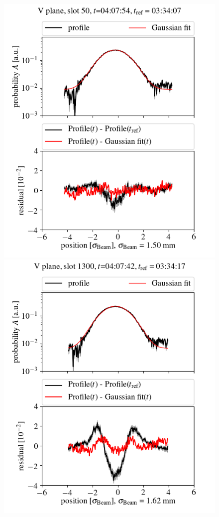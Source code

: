 \documentclass[%
 reprint,
 amsmath,amssymb,
 aps,
prstab,
]{revtex4-1}
\begin{document}
\begin{figure}[h]
	\begin{minipage}[t]{0.49\linewidth}
		\centering
		\includegraphics[width=1.0\linewidth]{profile_v10th_slot_50.png}
	\end{minipage}
	\begin{minipage}[t]{0.49\linewidth}
		\centering
		\includegraphics[width=1.0\linewidth]{profile_v10th_slot_1300.png}

\end{minipage}
\end{figure}
\end{document}
